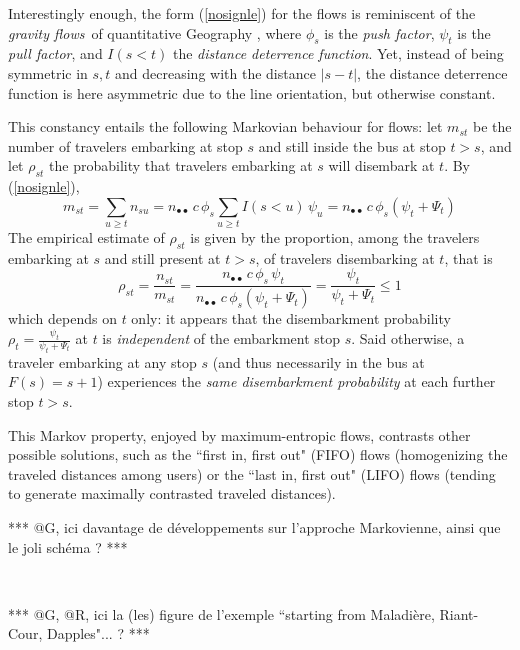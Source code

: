 \documentclass{bmcart}
\begin{document}
Interestingly enough, the form (\ref{nosignle}) for the flows is reminiscent of the {\em gravity flows} of quantitative Geography \cite{wilson1967statistical}  \cite{erlander1990gravity} \cite{bavaud2002quasi} \cite{Thomas-Agnan2021}, where 
$\phi_s$ is the {\em push factor}, $\psi_t$ is the {\em pull factor}, and $I(s<t)$ the {\em distance deterrence function}. Yet, instead of  
being symmetric in $s,t$ and decreasing with the distance $|s-t|$, the distance deterrence function is here asymmetric due to the line orientation, but otherwise constant. 

This constancy entails the following Markovian behaviour for flows: let $m_{st}$ be the number of travelers embarking at stop $s$ and still inside the bus at stop $t>s$, and let $\rho_{st}$ the probability that travelers embarking at $s$ will disembark at $t$. By (\ref{nosignle}), 
\begin{displaymath}
m_{st}=\sum_{u\ge t}n_{su}=n_{\bullet\bullet}\, c\, \phi_s  \sum_{u\ge t} I(s<u)\, \psi_u =n_{\bullet\bullet}\, c\,  \phi_s (\psi_t+\Psi_t) 
\end{displaymath}
The empirical estimate of $\rho_{st}$ is given by the proportion, among the travelers embarking at $s$ and 
 still present at $t>s$,  of travelers disembarking at $t$, that is 
\begin{displaymath}
\rho_{st}=\frac{n_{st}}{m_{st}}=\frac{n_{\bullet\bullet}\, c\,  \phi_s\,   \psi_t}{n_{\bullet\bullet}\, c\,  \phi_s (\psi_t+\Psi_t)}=\frac{\psi_t}{\psi_t+\Psi_t}\le 1 
\end{displaymath}
which depends on $t$ only: it appears that the disembarkment probability $\rho_t=\frac{\psi_t}{\psi_t+\Psi_t}$ at $t$ is {\em independent} of the embarkment stop $s$. Said otherwise, a traveler embarking at any stop $s$ (and thus necessarily in the bus at $F(s)=s+1$) experiences the {\em same disembarkment probability} at each further stop $t>s$. 


This Markov property, enjoyed by maximum-entropic flows, contrasts other possible solutions, such as  the ``first in, first out" (FIFO) flows (homogenizing the 
traveled distances among users) or the ``last in, first out" (LIFO) flows (tending to generate maximally  contrasted traveled distances).


***  @G, ici davantage de développements sur l'approche Markovienne, ainsi que le joli schéma ?  ***


\

*** @G, @R, ici la (les) figure de l'exemple  ``starting from Maladière, Riant-Cour, Dapples"... ? ***
\end{document}
